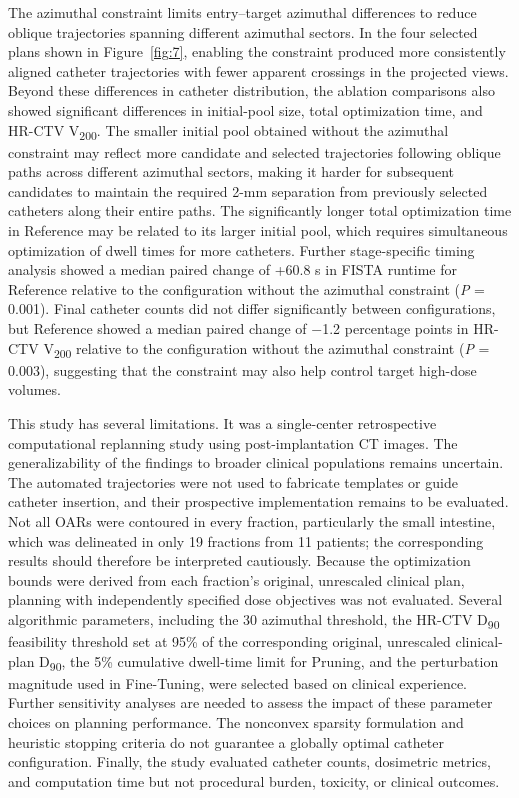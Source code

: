 \documentclass[12pt,twoside,letterpaper]{article}
\newcounter{algorithm}
\begin{document}
The azimuthal constraint limits entry--target azimuthal differences to reduce oblique trajectories spanning different azimuthal sectors. In the four selected plans shown in Figure~\ref{fig:7}, enabling the constraint produced more consistently aligned catheter trajectories with fewer apparent crossings in the projected views. Beyond these differences in catheter distribution, the ablation comparisons also showed significant differences in initial-pool size, total optimization time, and HR-CTV V\textsubscript{200}. The smaller initial pool obtained without the azimuthal constraint may reflect more candidate and selected trajectories following oblique paths across different azimuthal sectors, making it harder for subsequent candidates to maintain the required 2-mm separation from previously selected catheters along their entire paths. The significantly longer total optimization time in Reference may be related to its larger initial pool, which requires simultaneous optimization of dwell times for more catheters. Further stage-specific timing analysis showed a median paired change of +60.8 s in FISTA runtime for Reference relative to the configuration without the azimuthal constraint (\emph{P} = 0.001). Final catheter counts did not differ significantly between configurations, but Reference showed a median paired change of \ensuremath{-}1.2 percentage points in HR-CTV V\textsubscript{200} relative to the configuration without the azimuthal constraint (\emph{P} = 0.003), suggesting that the constraint may also help control target high-dose volumes.

This study has several limitations. It was a single-center retrospective computational replanning study using post-implantation CT images. The generalizability of the findings to broader clinical populations remains uncertain. The automated trajectories were not used to fabricate templates or guide catheter insertion, and their prospective implementation remains to be evaluated. Not all OARs were contoured in every fraction, particularly the small intestine, which was delineated in only 19 fractions from 11 patients; the corresponding results should therefore be interpreted cautiously. Because the optimization bounds were derived from each fraction's original, unrescaled clinical plan, planning with independently specified dose objectives was not evaluated. Several algorithmic parameters, including the 30\textdegree{} azimuthal threshold, the HR-CTV D\textsubscript{90} feasibility threshold set at 95\% of the corresponding original, unrescaled clinical-plan D\textsubscript{90}, the 5\% cumulative dwell-time limit for Pruning, and the perturbation magnitude used in Fine-Tuning, were selected based on clinical experience. Further sensitivity analyses are needed to assess the impact of these parameter choices on planning performance. The nonconvex sparsity formulation and heuristic stopping criteria do not guarantee a globally optimal catheter configuration. Finally, the study evaluated catheter counts, dosimetric metrics, and computation time but not procedural burden, toxicity, or clinical outcomes.
\end{document}
